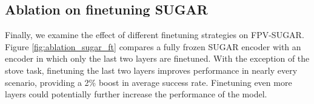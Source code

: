 \subsection{Ablation on finetuning SUGAR}

Finally, we examine the effect of different finetuning strategies on FPV-SUGAR. Figure \ref{fig:ablation_sugar_ft} compares a fully frozen SUGAR encoder with an encoder in which only the last two layers are finetuned. With the exception of the stove task, finetuning the last two layers improves performance in nearly every scenario, providing a 2\% boost in average success rate. Finetuning even more layers could potentially further increase the performance of the model.



